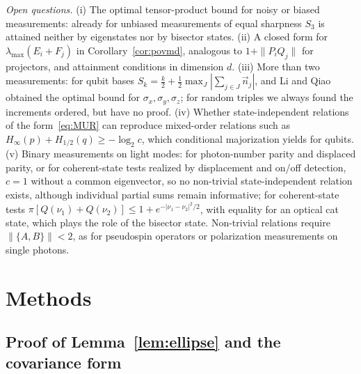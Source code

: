 \documentclass[11pt]{article}
\theoremstyle{definition}
\begin{document}
\emph{Open questions.} (i) The optimal tensor-product bound for noisy or biased
measurements: already for unbiased measurements of equal sharpness $S_3$ is
attained neither by eigenstates nor by bisector states. (ii) A closed form for
$\lambda_{\max}(E_i+F_j)$ in Corollary~\ref{cor:povmd}, analogous to
$1+\|P_iQ_j\|$ for projectors, and attainment conditions in dimension $d$.
(iii) More than two measurements: for qubit bases
$S_k=\frac k2+\frac12\max_J|\sum_{j\in J}\vec n_j|$, and Li and Qiao obtained the optimal
bound for $\sigma_x,\sigma_y,\sigma_z$\cite{LiQiao2019}; for random triples we always
found the increments ordered, but have no proof. (iv) Whether state-independent
relations of the form~\eqref{eq:MUR} can reproduce mixed-order relations such as
$H_\infty(p)+H_{1/2}(q)\ge-\log_2c$, which conditional majorization yields for
qubits\cite{XiaoFangGour2019}. (v) Binary measurements on light modes: for
photon-number parity and displaced parity, or for coherent-state tests realized
by displacement and on/off detection, $c=1$ without a common eigenvector, so no
non-trivial state-independent relation exists, although individual partial sums
remain informative; for coherent-state tests
$\pi[Q(\nu_1)+Q(\nu_2)]\le1+e^{-|\nu_1-\nu_2|^2/2}$, with equality for an optical cat
state\cite{Ourjoumtsev2007,Lewenstein2021}, which plays the role of the bisector
state. Non-trivial relations require $\|\{A,B\}\|<2$, as for pseudospin
operators\cite{Chen2002} or polarization measurements on single photons.

\section*{Methods}

\subsection*{Proof of Lemma~\ref{lem:ellipse} and the covariance form}
\end{document}
